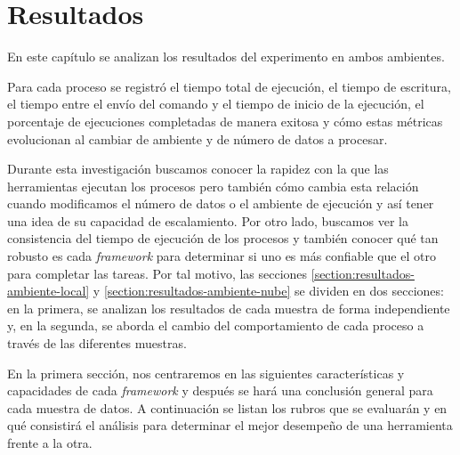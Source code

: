 \chapter{Resultados}
\label{chapter:resultados}

\noindent En este capítulo se analizan los resultados del experimento en ambos ambientes. 

Para cada proceso se registró el tiempo total de ejecución, el tiempo de escritura, el tiempo entre el envío del comando y el tiempo de inicio de la ejecución, el porcentaje de ejecuciones completadas de manera exitosa y cómo estas métricas evolucionan al cambiar de ambiente y de número de datos a procesar.

Durante esta investigación buscamos conocer la rapidez con la que las herramientas ejecutan los procesos pero también cómo cambia esta relación cuando modificamos el número de datos o el ambiente de ejecución y así tener una idea de su capacidad de escalamiento. Por otro lado, buscamos ver la consistencia del tiempo de ejecución de los procesos y también conocer qué tan robusto es cada \textit{framework} para determinar si uno es más confiable que el otro para completar las tareas. Por tal motivo, las secciones \ref{section:resultados-ambiente-local} y \ref{section:resultados-ambiente-nube} se dividen en dos secciones: en la primera, se analizan los resultados de cada muestra de forma independiente y, en la segunda, se aborda el cambio del comportamiento de cada proceso a través de las diferentes muestras.

En la primera sección, nos centraremos en las siguientes características y capacidades de cada \textit{framework} y después se hará una conclusión general para cada muestra de datos. A continuación se listan los rubros que se evaluarán y en qué consistirá el análisis para determinar el mejor desempeño de una herramienta frente a la otra.


